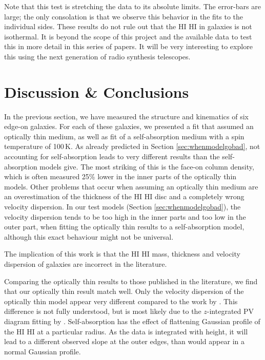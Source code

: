 \documentclass[useAMS,usenatbib]{mn2e}
\newcommand{\hi}{%
  \relax
  \ifmmode
    \textrm{\textsc{HI}}
  \else
    \textsc{H{\smaller}I}
  \fi
}
\begin{document}
Note that this test is stretching the data to its absolute limits.
The error-bars are large; the only consolation is that we observe 
this behavior in the fits to the individual sides.
These results do not rule out that the \hi in galaxies is not isothermal.
It is beyond the scope of this project and the available data to 
test this in more detail in this series of papers.
It will be very interesting to explore this using the next 
generation of radio synthesis telescopes.

\section{Discussion \& Conclusions}
In the previous section, we have measured the structure and kinematics of 
six edge-on galaxies.
For each of these galaxies, we presented a fit that assumed an optically 
thin medium, as well as fit of a self-absorption medium with a spin 
temperature of 100\,K.
As already predicted in Section \ref{sec:whenmodelgobad}, not 
accounting for self-absorption leads to very different results 
than the self-absorption models give.
The most striking of this is the face-on column density, which 
is often measured 25\% lower in the inner parts of the optically 
thin models. 
Other problems that occur when assuming an optically thin medium 
are an overestimation of the thickness of the \hi disc and a 
completely wrong velocity dispersion.
In our test models (Section \ref{sec:whenmodelgobad}), the 
velocity dispersion tends to be too high in the inner parts and 
too low in the outer part, when fitting the optically thin results 
to a self-absorption model, although this exact behaviour might not 
be universal.

The implication of this work is that the \hi mass, thickness and 
velocity dispersion of galaxies are incorrect in the literature.

Comparing the optically thin results to those published in the literature, 
we find that our optically thin result match well.
Only the velocity dispersion of the optically thin model appear very 
different compared to the work by \citet{OBrien2010C}.
This difference is not fully understood, but is most likely due to 
the $z$-integrated PV diagram fitting by \citet{OBrien2010C}.
Self-absorption has the effect of flattening Gaussian profile of 
the \hi at a particular radius.
As the data is integrated with height, it will lead to a different 
observed slope at the outer edges, than would appear in a normal 
Gaussian profile.
\end{document}
